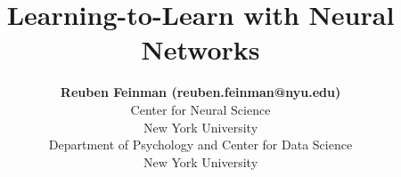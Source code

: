 \documentclass[10pt,letterpaper]{article}
\title{Learning-to-Learn with Neural Networks}
\author{{\large \bf Reuben Feinman (reuben.feinman@nyu.edu)} \\
  Center for Neural Science \\
  New York University
  \AND {\large \bf Brenden M. Lake (brenden@nyu.edu)} \\
  Department of Psychology and Center for Data Science \\
  New York University}
\begin{document}
\maketitle


\begin{abstract}
    
\end{abstract}





\nocite{Ritter2017}




\setlength{\bibleftmargin}{.125in}
\setlength{\bibindent}{-\bibleftmargin}


\end{document}
